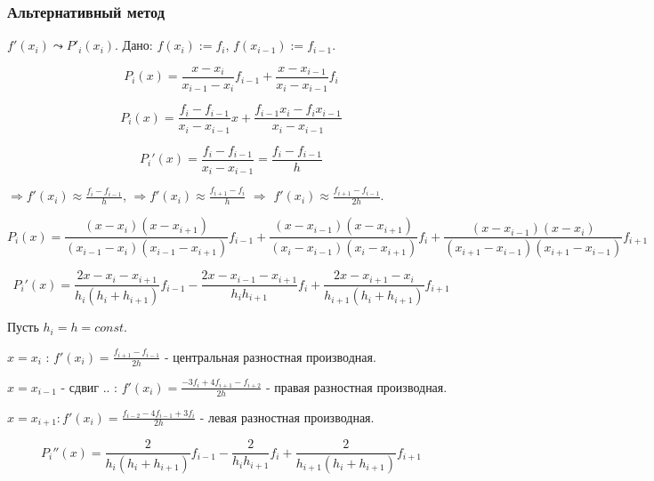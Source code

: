 \subsubsection{Альтернативный метод}

$ f'(x_i) \leadsto P'_i(x_i) $.
Дано: $ f(x_i) := f_i $, $ f(x_{i-1}) := f_{i-1} $.

\begin{equation}
    P_i(x) = \frac{x - x_i}{x_{i-1} - x_i} f_{i-1} + \frac{x - x_{i-1}}{x_i - x_{i-1}} f_i
\end{equation}

\begin{equation}
    P_i(x) = \frac{f_i - f_{i-1}}{x_i - x_{i-1}} x + \frac{f_{i-1} x_i - f_i x_{i-1}}{x_i - x_{i-1}}
\end{equation}

\begin{equation}
    P_i'(x) = \frac{f_i - f_{i-1}}{x_i - x_{i-1}} = \frac{f_i - f_{i-1}}{h}
\end{equation}

$ \Rightarrow f'(x_i) \approx \frac{f_i - f_{i-1}}{h} $, 
$ \Rightarrow f'(x_i) \approx \frac{f_{i+1} - f_i}{h} $ $\Rightarrow$ 
$ f'(x_i) \approx \frac{f_{i+1} - f_{i-1}}{2h} $.

\begin{equation}
    P_i(x) = \frac{(x - x_i)(x - x_{i+1})}{(x_{i-1} - x_i)(x_{i-1} - x_{i+1})} f_{i-1} + 
        \frac{(x - x_{i-1})(x - x_{i+1})}{(x_i - x_{i-1})(x_i - x_{i+1})} f_i + 
        \frac{(x - x_{i-1})(x - x_i)}{(x_{i+1} - x_{i-1})(x_{i+1} - x_{i-1})} f_{i+1}
\end{equation}

\begin{equation}
    P_i'(x) = \frac{2x - x_i - x_{i+1}}{h_i(h_i + h_{i+1})} f_{i-1} -
        \frac{2x - x_{i-1} - x_{i+1}}{h_i h_{i+1}} f_i + 
        \frac{2x - x_{i+1} - x_i}{h_{i+1}(h_i + h_{i+1})} f_{i+1}
\end{equation}

Пусть $ h_i = h = const $. 

$ x = x_i $ : $ f'(x_i) = \frac{f_{i+1} - f_{i-1}}{2h} $ - центральная разностная производная.

$ x = x_{i-1} $ - сдвиг .. : $ f'(x_i) = \frac{- 3 f_i + 4 f_{i+1} - f_{i+2}}{2h} $ - правая разностная производная.

$ x = x_{i+1} : f'(x_i) = \frac{f_{i-2} - 4 f_{i-1} + 3 f_i}{2h} $ - левая разностная производная.

\begin{equation}
    P_i''(x) = \frac{2}{h_i(h_i + h_{i+1})} f_{i-1} -
        \frac{2}{h_i h_{i+1}} f_i + 
        \frac{2}{h_{i+1}(h_i + h_{i+1})} f_{i+1}
\end{equation}

